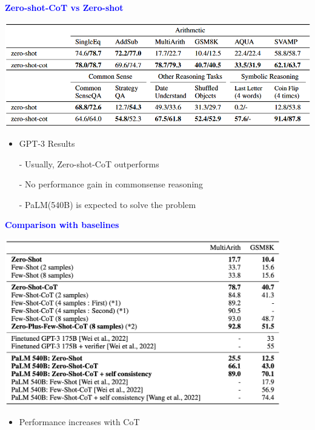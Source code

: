 \documentclass[professionalfont]{beamer}
\begin{document}
\begin{frame}

\begin{center}
    { \textbf{\textcolor{blue}{ {\fontsize{12}{14}\selectfont Zero-shot-CoT vs Zero-shot} }} }
\end{center}

\begin{center}
    \includegraphics[width=1.0\textwidth]{table//1.png}
\end{center}

{\fontsize{10}{14}\selectfont 
\begin{itemize}
    \item GPT-3 Results
    
    - Usually, Zero-shot-CoT outperforms

    - No performance gain in commonsense reasoning

    - PaLM(540B) is expected to solve the problem
\end{itemize}
}
\end{frame}

\begin{frame}
\begin{center}
    { \textbf{\textcolor{blue}{ {\fontsize{12}{14}\selectfont Comparison with baselines} }} }
\end{center}

\begin{center}
    \includegraphics[width=0.9\textwidth]{table//2.png}
\end{center}

{\fontsize{10}{14}\selectfont 
\begin{itemize}
    \item Performance increases with CoT
\end{itemize}
}

\end{frame}
\end{document}
